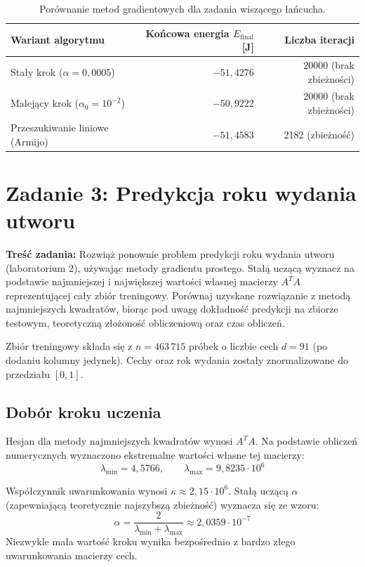 \documentclass[12pt, a4paper]{article}
\begin{document}
\begin{table}[H]
  \centering
  \caption{Porównanie metod gradientowych dla zadania wiszącego łańcucha.}
  \label{tab:tabela1}
  \begin{tabular}{lrr}
    \toprule
    Wariant algorytmu & Końcowa energia $E_{\text{final}}$ [J] & Liczba iteracji \\
    \midrule
    Stały krok ($\alpha = 0{,}0005$) & $-51{,}4276$ & 20000 (brak zbieżności) \\
    Malejący krok ($\alpha_0 = 10^{-2}$) & $-50{,}9222$ & 20000 (brak zbieżności) \\
    Przeszukiwanie liniowe (Armijo) & $-51{,}4583$ & 2182 (zbieżność) \\
    \bottomrule
  \end{tabular}
\end{table}


\section{Zadanie 3: Predykcja roku wydania utworu}

\textbf{Treść zadania:} Rozwiąż ponownie problem predykcji roku wydania utworu (laboratorium 2), używając metody gradientu prostego. Stałą uczącą wyznacz na podstawie najmniejszej i największej wartości własnej macierzy $A^T A$ reprezentującej cały zbiór treningowy. Porównaj uzyskane rozwiązanie z metodą najmniejszych kwadratów, biorąc pod uwagę dokładność predykcji na zbiorze testowym, teoretyczną złożoność obliczeniową oraz czas obliczeń.

Zbiór treningowy składa się z $n = 463\,715$ próbek o liczbie cech $d = 91$ (po dodaniu kolumny jedynek). Cechy oraz rok wydania zostały znormalizowane do przedziału $[0, 1]$.

\subsection{Dobór kroku uczenia}
Hesjan dla metody najmniejszych kwadratów wynosi $A^T A$. Na podstawie obliczeń numerycznych wyznaczono ekstremalne wartości własne tej macierzy:
\[
  \lambda_{\min} = 4{,}5766, \qquad \lambda_{\max} = 9{,}8235 \cdot 10^6
\]

Współczynnik uwarunkowania wynosi $\kappa \approx 2{,}15 \cdot 10^6$. Stałą uczącą $\alpha$ (zapewniającą teoretycznie najszybszą zbieżność) wyznacza się ze wzoru:
\[
  \alpha = \frac{2}{\lambda_{\min} + \lambda_{\max}} \approx 2{,}0359 \cdot 10^{-7}
\]
Niezwykle mała wartość kroku wynika bezpośrednio z bardzo złego uwarunkowania macierzy cech.
\end{document}
